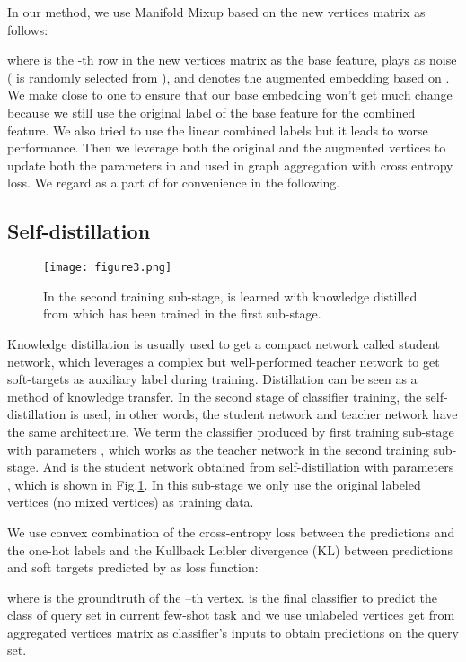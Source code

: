 \documentclass[conference]{IEEEtran}
\begin{document}
In our method, we use Manifold Mixup based on the new vertices matrix as follows:

where  is the  -th row in the new vertices matrix as the base feature,  plays as noise ( is randomly selected from ), and  denotes the augmented embedding based on . We make  close to one to ensure that our base embedding won’t get much change because we still use the original label of the base feature for the combined feature. We also tried to use the linear combined labels but it leads to worse performance. 
Then we leverage both the original and the augmented vertices to update both the parameters  in  and  used in graph aggregation with cross entropy loss. We regard  as a part of  for convenience in the following.

\subsection{Self-distillation}\label{3.4}
\begin{figure}[htbp]
\centerline{\texttt{[image: figure3.png]}}
\caption{In the second training sub-stage,  is learned with knowledge distilled from  which has been trained in the first sub-stage.}
\label{fig3}
\end{figure}

Knowledge distillation \cite{yim2017gift} is usually used to get a compact network called student network, which leverages a complex but well-performed teacher network to get soft-targets as auxiliary label during training. Distillation can be seen as a method of knowledge transfer. In the second stage of classifier training, the self-distillation is used, in other words, the student network and teacher network have the same architecture. We term the classifier produced by first training sub-stage  with parameters , which works as the teacher network in the second training sub-stage. And  is the student network obtained from self-distillation with parameters , which is shown in Fig.\ref{fig3}. In this sub-stage we only use the original labeled vertices (no mixed vertices) as training data.

We use convex combination of the cross-entropy loss between the predictions and the one-hot labels and the Kullback Leibler divergence (KL) between predictions and soft targets predicted by  as loss function:


where  is the groundtruth of the –th vertex.  is the final classifier to predict the class of query set in current few-shot task and we use unlabeled vertices get from aggregated vertices matrix  as classifier’s inputs to obtain predictions on the query set.
\end{document}
